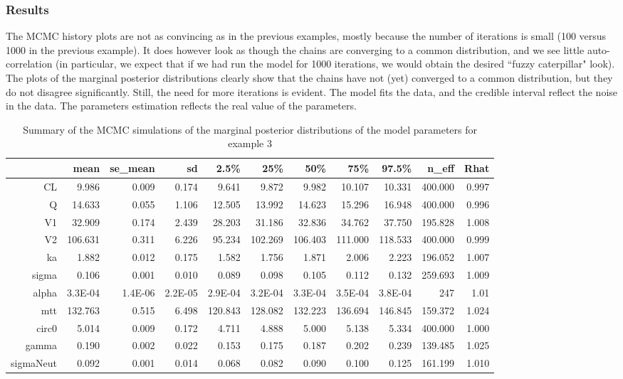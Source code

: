 \documentclass[11pt]{amsart}
\begin{document}
\subsubsection*{Results} The MCMC history plots are not as convincing as in the previous examples, mostly because the number of iterations is small (100 versus 1000 in the previous example). It does however look as though the chains are converging to a common distribution, and we see little auto-correlation (in particular, we  expect that if we had run the model for 1000 iterations, we would obtain the desired ``fuzzy caterpillar" look). The plots of the marginal posterior distributions clearly show that the chains have not (yet) converged to a common distribution, but they do not disagree significantly. Still, the need for more iterations is evident. The model fits the data, and the credible interval reflect the noise in the data. The parameters estimation reflects the real value of the parameters.

{\tiny
\begin{table}[!htb]
\centering
\caption{Summary of the MCMC simulations of the marginal posterior distributions of the model parameters for example 3}
\begin{tabular}{rrrrrrrrrrr}
  \hline
 & mean & se\_mean & sd & 2.5\% & 25\% & 50\% & 75\% & 97.5\% & n\_eff & Rhat \\ 
  \hline
CL & 9.986 & 0.009 & 0.174 & 9.641 & 9.872 & 9.982 & 10.107 & 10.331 & 400.000 & 0.997 \\
Q & 14.633 & 0.055 & 1.106 & 12.505 & 13.992 & 14.623 & 15.296 & 16.948 & 400.000 & 0.996 \\
V1 & 32.909 & 0.174 & 2.439 & 28.203 & 31.186 & 32.836 & 34.762 & 37.750 & 195.828 & 1.008 \\
V2 & 106.631 & 0.311 & 6.226 & 95.234 & 102.269 & 106.403 & 111.000 & 118.533 & 400.000 & 0.999 \\
ka & 1.882 & 0.012 & 0.175 & 1.582 & 1.756 & 1.871 & 2.006 & 2.223 & 196.052 & 1.007 \\
sigma & 0.106 & 0.001 & 0.010 & 0.089 & 0.098 & 0.105 & 0.112 & 0.132 & 259.693 & 1.009 \\
alpha & 3.3E-04 & 1.4E-06 & 2.2E-05 & 2.9E-04 & 3.2E-04 & 3.3E-04 & 3.5E-04 & 3.8E-04 & 247 & 1.01 \\
mtt & 132.763 & 0.515 & 6.498 & 120.843 & 128.082 & 132.223 & 136.694 & 146.845 & 159.372 & 1.024 \\
circ0 & 5.014 & 0.009 & 0.172 & 4.711 & 4.888 & 5.000 & 5.138 & 5.334 & 400.000 & 1.000 \\
gamma & 0.190 & 0.002 & 0.022 & 0.153 & 0.175 & 0.187 & 0.202 & 0.239 & 139.485 & 1.025 \\
sigmaNeut & 0.092 & 0.001 & 0.014 & 0.068 & 0.082 & 0.090 & 0.100 & 0.125 & 161.199 & 1.010 \\
  \hline
\end{tabular}
\end{table} 
}
\end{document}
